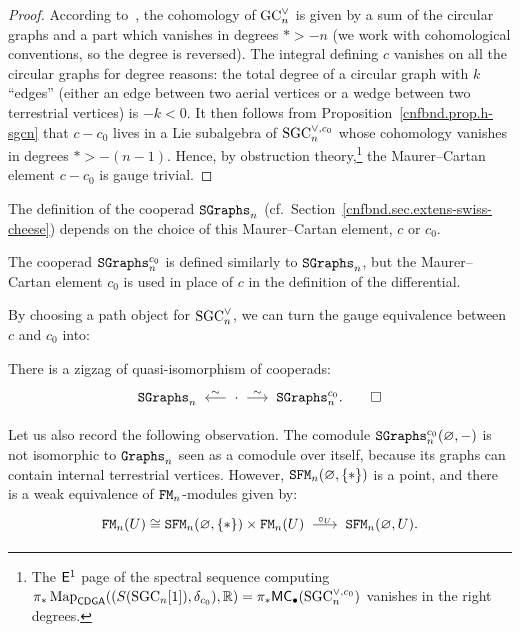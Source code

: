 \begin{proof}
  According to~\cite[Proposition~2.2.3]{FresseWillwacher2015}, the cohomology of $\mathrm{GC}_{n}^{\vee}$ is given by a sum of the circular graphs and a part which vanishes in degrees $* > -n$ (we work with cohomological conventions, so the degree is reversed).
  The integral defining $c$ vanishes on all the circular graphs for degree reasons: the total degree of a circular graph with $k$ ``edges'' (either an edge between two aerial vertices or a wedge between two terrestrial vertices) is $-k < 0$.
  It then follows from Proposition~\ref{cnfbnd.prop.h-sgcn} that $c - c_{0}$ lives in a Lie subalgebra of $\mathrm{SGC}_{n}^{\vee, c_{0}}$ whose cohomology vanishes in degrees $* > -(n - 1)$.
  Hence, by obstruction theory,\footnote{The $\mathsf{E}^{1}$ page of the spectral sequence computing $\pi_{*} \operatorname{Map}_{\mathsf{CDGA}}((S(\mathrm{SGC}_{n}[1]), \delta_{c_{0}}), \mathbb{R}) = \pi_{*} \mathsf{MC}_{\bullet}(\mathrm{SGC}_{n}^{\vee,c_{0}})$ vanishes in the right degrees.} the Maurer--Cartan element $c - c_{0}$ is gauge trivial.
\end{proof}

The definition of the cooperad $\mathtt{SGraphs}_{n}$ (cf.\ Section~\ref{cnfbnd.sec.extens-swiss-cheese}) depends on the choice of this Maurer--Cartan element, $c$ or $c_{0}$.

\begin{definition}
  \label{cnfbnd.def.sgraphs0}
  The cooperad $\mathtt{SGraphs}_{n}^{c_{0}}$ is defined similarly to $\mathtt{SGraphs}_{n}$, but the Maurer--Cartan element $c_{0}$ is used in place of $c$ in the definition of the differential.
\end{definition}

By choosing a path object for $\mathrm{SGC}_{n}^{\vee}$, we can turn the gauge equivalence between $c$ and $c_{0}$ into:
\begin{corollary}
  \label{cnfbnd.cor.sgraphs-c0}
  There is a zigzag of quasi-isomorphism of cooperads:
  \begin{equation*}
    \SGraphs_{n} \qiso* \cdot \qiso \SGraphs_{n}^{c_{0}}.
    \qed
  \end{equation*}
\end{corollary}

Let us also record the following observation.
The comodule $\mathtt{SGraphs}_{n}^{c_{0}}(\varnothing, -)$ is not isomorphic to $\mathtt{Graphs}_{n}$ seen as a comodule over itself, because its graphs can contain internal terrestrial vertices.
However, $\mathtt{SFM}_{n}(\varnothing, \{*\})$ is a point, and there is a weak equivalence of $\mathtt{FM}_{n}$-modules given by:
\begin{equation}
  \FM_{n}(U) \cong \SFM_{n}(\varnothing, \{*\}) \times \FM_{n}(U) \tkrightarrow{\circ_{U}} \SFM_{n}(\varnothing, U).
\end{equation}

